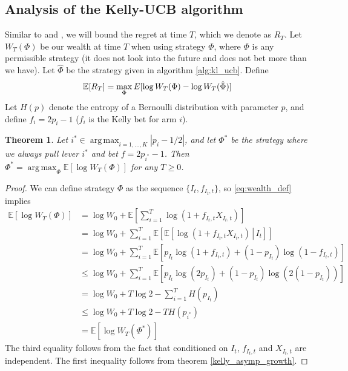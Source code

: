 \documentclass[letterpaper]{article}
\DeclareMathOperator*{\argmax}{arg\,max}
\numberwithin{equation}{section}
\theoremstyle{plain}
\newtheorem{theorem}{Theorem}[section]
\begin{document}
\subsection{Analysis of the Kelly-UCB algorithm}\label{analysiskellyucb}
Similar to \cite{cappe2013kullback} and \cite{bubeck2012regret}, we will bound the regret at time $T$, which we denote as $R_T$. Let $W_T(\Phi)$ be our wealth at time $T$ when using strategy $\Phi$, where $\Phi$ is any permissible strategy (it does not look into the future and does not bet more than we have). Let $\hat{\Phi}$ be the strategy given in algorithm \ref{alg:kl_ucb}. Define
\begin{equation}\label{eq:regret_def}
\mathbb{E}[R_T] = \max_\Phi E[\log W_T(\Phi) - \log W_T(\hat{\Phi})]\\
\end{equation}
Let $H(p)$ denote the entropy of a Bernoulli distribution with parameter $p$, and define $f_i = 2p_i-1$ ($f_i$ is the Kelly bet for arm $i$).
\begin{theorem}\label{thm:kelly_optimal_mab}
Let $i^*\in\argmax_{i=1,\ldots,K}|p_i-1/2|$, and let $\Phi^*$ be the strategy where we always pull lever $i^*$ and bet $f = 2p_{i^*}-1$. Then $\Phi^* = \argmax_{\Phi} \mathbb{E}[\log W_T(\Phi)]$ for any $T \ge 0$.
\end{theorem}
\begin{proof}
We can define strategy $\Phi$ as the sequence $\{I_t,f_{I_t,t}\}$, so \eqref{eq:wealth_def} implies
\begin{align}
\mathbb{E}[\log W_T(\Phi)] &= \log W_0 + \mathbb{E}\left[\sum_{i=1}^T \log(1+f_{I_t,t}X_{I_t,t})\right]\\
&= \log W_0 + \sum_{i=1}^T \mathbb{E}\left[\mathbb{E}\left[\left.\log(1+f_{I_t,t}X_{I_t,t})\,\right\rvert\, I_t\right]\right]\\
&= \log W_0 + \sum_{i=1}^T \mathbb{E}\left[p_{I_t}\log(1+f_{I_t,t})+(1-p_{I_t})\log(1-f_{I_t,t})\right]\\
&\le \log W_0 + \sum_{i=1}^T \mathbb{E}\left[p_{I_t}\log(2p_{I_t})+(1-p_{I_t})\log(2(1-p_{I_t}))\right]\\
&= \log W_0 + T\log 2 - \sum_{i=1}^T H(p_{I_t})\\
&\le \log W_0 + T\log 2 - T H(p_{i^*})\\
&= \mathbb{E}[\log W_T(\Phi^*)]
\end{align}
The third equality follows from the fact that conditioned on $I_t$, $f_{I_t,t}$ and $X_{I_t,t}$ are independent. The first inequality follows from theorem \ref{kelly_asymp_growth}.
\end{proof}
\end{document}
